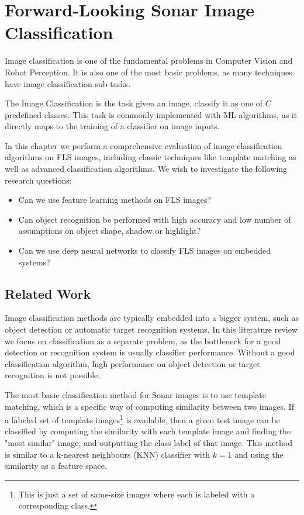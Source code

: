 \chapter[Forward-Looking Sonar Image Classification]{Forward-Looking Sonar \newline Image Classification}
\label{chapter:sonar-classification}

Image classification is one of the fundamental problems in Computer Vision and Robot Perception. It is also one of the most basic problems, as many techniques have image classification sub-tasks.

The Image Classification is the task given an image, classify it as one of $C$ predefined classes. This task is commonly implemented with ML algorithms, as it directly maps to the training of a classifier on image inputs.

In this chapter we perform a comprehensive evaluation of image classification algorithms on FLS images, including classic techniques like template matching as well as advanced classification algorithms. We wish to investigate the following research questions:

\begin{itemize}
	\item Can we use feature learning methods on FLS images?
	\item Can object recognition be performed with high accuracy and low number of assumptions on object shape, shadow or highlight?
    \item Can we use deep neural networks to classify FLS images on embedded systems?
\end{itemize}

\section{Related Work}

Image classification methods are typically embedded into a bigger system, such as object detection or automatic target recognition systems. In this literature review we focus on classification as a separate problem, as the bottleneck for a good detection or recognition system is usually classifier performance. Without a good classification algorithm, high performance on object detection or target recognition is not possible.

The most basic classification method for Sonar images is to use template matching, which is a specific way of computing similarity between two images. If a labeled set of template images\footnote{This is just a set of same-size images where each is labeled with a corresponding class.} is available, then a given test image can be classified by computing the similarity with each template image and finding the "most similar" image, and outputting the class label of that image. This method is similar to a k-nearest neighbours (KNN) classifier with $k = 1$ and using the similarity as a feature space.

